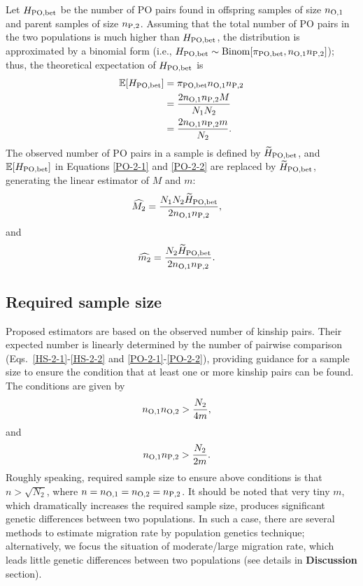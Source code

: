 \documentclass[12pt, English]{article}
\begin{document}
\begin{spacing}{1.9}
Let $H_{\rm PO,bet}$ be the number of PO pairs found in offspring samples of size $n_{\rm O, 1}$ and parent samples of size $n_{\rm P, 2}$. Assuming that the total number of PO pairs in the two populations is much higher than $H_{\rm PO,bet}$, the distribution is approximated by a binomial form (i.e., $H_{\rm PO,bet} \sim {\rm Binom}[\pi_{\rm PO,bet}, n_{\rm O, 1} n_{\rm P, 2}]$); thus, the theoretical expectation of $H_{\rm PO,bet}$ is
\begin{align}
\mathbb{E}[H_{\rm PO, bet}] &= \pi_{\rm PO,bet} n_{\rm O, 1} n_{\rm P, 2} \nonumber\\
&= \frac{ 2 n_{\rm O, 1} n_{\rm P, 2} M } { N_{1} N_{2} } \label{PO-2-1} \\
&= \frac{ 2 n_{\rm O, 1} n_{\rm P, 2} m } { N_{2} }.
\label{PO-2-2}
\end{align}
The observed number of PO pairs in a sample is defined by $\widetilde{H}_{\rm PO, bet}$, and $\mathbb{E}[H_{\rm PO, bet}]$ in Equations \ref{PO-2-1} and \ref{PO-2-2} are replaced by $\widetilde{H}_{\rm PO, bet}$, generating the linear estimator of $M$ and $m$:
\begin{align}
\widehat{M_2} &= \frac{N_{1} N_{2} \widetilde{H}_{\rm PO,bet} } {2 n_{\rm O, 1} n_{\rm P, 2} },
\label{PO-3}
\end{align}
and
\begin{align}
\widehat{m_2} &= \frac{N_{2} \widetilde{H}_{\rm PO,bet} } {2 n_{\rm O, 1} n_{\rm P, 2} }.
\label{PO-4}
\end{align}

\subsection{Required sample size}

Proposed estimators are based on the observed number of kinship pairs. Their expected number is linearly determined by the number of pairwise comparison (Eqs.~\ref{HS-2-1}-\ref{HS-2-2} and \ref{PO-2-1}-\ref{PO-2-2}), providing guidance for a sample size to ensure the condition that at least one or more kinship pairs can be found. The conditions are given by
\begin{align}
n_{\rm O, 1} n_{\rm O, 2} &> \frac{ N_{2} } { 4m },
\label{RS-1}
\end{align}
and
\begin{align}
n_{\rm O, 1} n_{\rm P, 2} &> \frac{ N_{2} } { 2m }.
\label{RS-2}
\end{align}
Roughly speaking, required sample size to ensure above conditions is that $n>\sqrt{N_2}$, where $n = n_{\rm O, 1}=n_{\rm O, 2}=n_{\rm P, 2}$. It should be noted that very tiny $m$, which dramatically increases the required sample size, produces significant genetic differences between two populations. In such a case, there are several methods to estimate migration rate by population genetics technique; alternatively, we focus the situation of moderate/large migration rate, which leads little genetic differences between two populations (see details in {\bf Discussion} section). 


\end{spacing}
\end{document}
